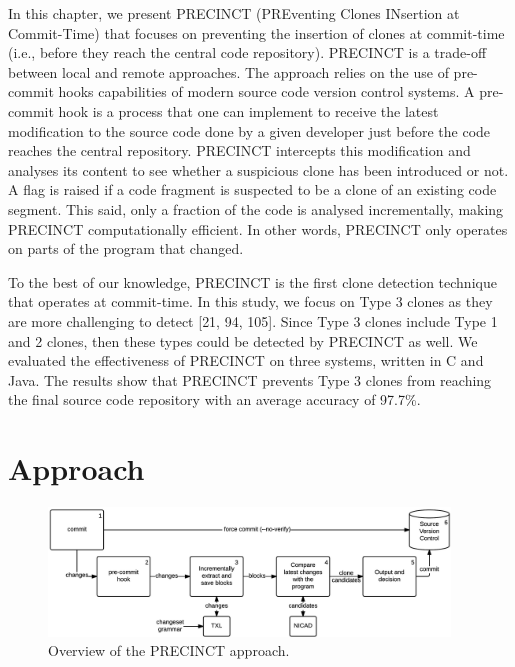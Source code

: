 \documentclass[12pt]{report}
\begin{document}
In this chapter, we present PRECINCT (PREventing Clones INsertion at
Commit-Time) that focuses on preventing the insertion of clones at
commit-time (i.e., before they reach the central code repository).
PRECINCT is a trade-off between local and remote approaches. The
approach relies on the use of pre-commit hooks capabilities of modern
source code version control systems. A pre-commit hook is a process that
one can implement to receive the latest modification to the source code
done by a given developer just before the code reaches the central
repository. PRECINCT intercepts this modification and analyses its
content to see whether a suspicious clone has been introduced or not. A
flag is raised if a code fragment is suspected to be a clone of an
existing code segment. This said, only a fraction of the code is
analysed incrementally, making PRECINCT computationally efficient. In
other words, PRECINCT only operates on parts of the program that
changed.

To the best of our knowledge, PRECINCT is the first clone detection
technique that operates at commit-time. In this study, we focus on Type
3 clones as they are more challenging to detect {[}21, 94, 105{]}. Since
Type 3 clones include Type 1 and 2 clones, then these types could be
detected by PRECINCT as well. We evaluated the effectiveness of PRECINCT
on three systems, written in C and Java. The results show that PRECINCT
prevents Type 3 clones from reaching the final source code repository
with an average accuracy of 97.7\%.

\section{Approach}\label{approach-1}

\begin{figure}
  \centering
  \includegraphics[width=0.95\textwidth]{media/chap5/approach.png}
  \caption{Overview of the PRECINCT approach.}
\end{figure}
\end{document}
